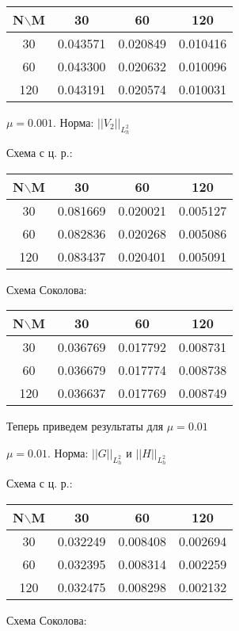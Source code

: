 \documentclass[specialist,subf,href,colorlinks=true,14pt,times,mtpro]{disser}
\begin{document}
\begin{tabular}{|c|c|c|c|}
    \hline
    N$\backslash$M & 30 & 60 & 120 \\
    \hline
    30 & 0.043571 & 0.020849 & 0.010416 \\
    \hline
    60 & 0.043300 & 0.020632 & 0.010096 \\
    \hline
    120 & 0.043191 & 0.020574 & 0.010031 \\
    \hline
\end{tabular}
\BlankLine
\BlankLine
\BlankLine
\newpage
$\mu = 0.001.$ Норма:  $||V_2||_{L^2_h}$

Схема с ц. р.:

\begin{tabular}{|c|c|c|c|}
    \hline
    N$\backslash$M & 30 & 60 & 120 \\
    \hline
    30 & 0.081669 & 0.020021 & 0.005127 \\
    \hline
    60 & 0.082836 & 0.020268 & 0.005086 \\
    \hline
    120 & 0.083437 & 0.020401 & 0.005091 \\
    \hline
\end{tabular}
\BlankLine
Схема Соколова:

\begin{tabular}{|c|c|c|c|}
    \hline
    N$\backslash$M & 30 & 60 & 120 \\
    \hline
    30 & 0.036769 & 0.017792 & 0.008731 \\
    \hline
    60 & 0.036679 & 0.017774 & 0.008738 \\
    \hline
    120 & 0.036637 & 0.017769 & 0.008749 \\
    \hline
\end{tabular}
\BlankLine
\BlankLine
\BlankLine
Теперь приведем результаты для $\mu = 0.01$

$\mu = 0.01.$ Норма:  $||G||_{L^2_h}$ и $||H||_{L^2_h}$

Схема с ц. р.:

\begin{tabular}{|c|c|c|c|}
    \hline
    N$\backslash$M & 30 & 60 & 120 \\
    \hline
    30 &   0.032249 & 0.008408 & 0.002694 \\
    \hline
    60 & 0.032395 & 0.008314 & 0.002259 \\
    \hline
    120 & 0.032475 & 0.008298 & 0.002132 \\
    \hline
\end{tabular}
\BlankLine
Схема Соколова:
\end{document}
